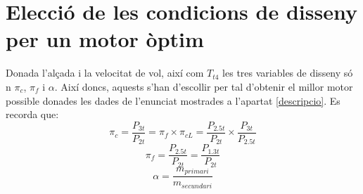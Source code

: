 \section{Elecció de les condicions de disseny per un motor òptim}
Donada l'alçada i la velocitat de vol, així com $T_{t4}$ les tres variables de disseny só	n $\pi_c$, $\pi_f$ i $\alpha$. Així doncs, aquests s'han d'escollir per tal d'obtenir el millor motor possible donades les dades de l'enunciat mostrades a l'apartat \ref{descripcio}.
Es recorda que:
\begin{equation*}
	\pi_c = \frac{P_{3t}}{P_{2t}} = \pi_{f}\times\pi_{cL} = \frac{P_{2.5t}}{P_{2t}} \times \frac{P_{3t}}{P_{2.5t}}
\end{equation*}
\begin{equation*}
	\pi_f = \frac{P_{2.5t}}{P_{2t}} = \frac{P_{1.3t}}{P_{2t}} 
\end{equation*}
\begin{equation*}
	\alpha = \frac{m_{primari}}{m_{secundari}}
\end{equation*}

